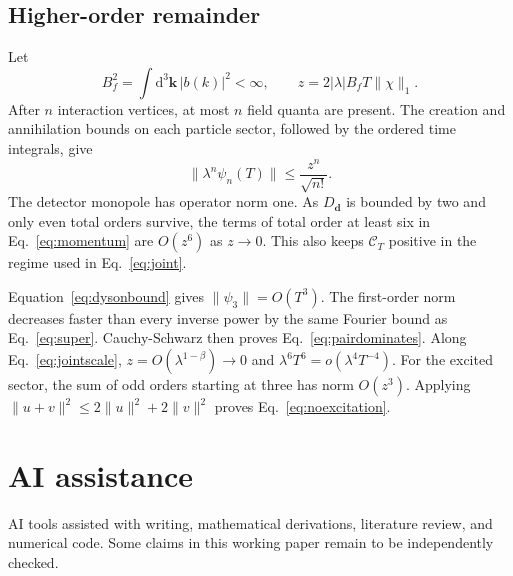 \documentclass[11pt,a4paper]{article}
\newcommand{\dd}{\mathrm{d}}
\newcommand{\cC}{\mathcal{C}}
\begin{document}
\subsection{Higher-order remainder}

Let
\begin{equation}
 B_f^2=\int\dd^3\bm k\,|b(k)|^2<\infty,
 \qquad z=2|\lambda|B_fT\|\chi\|_1.
\end{equation}
After $n$ interaction vertices, at most $n$ field quanta are present. The creation and annihilation bounds on each particle sector, followed by the ordered time integrals, give
\begin{equation}
 \|\lambda^n\psi_n(T)\|\leq\frac{z^n}{\sqrt{n!}}.\label{eq:dysonbound}
\end{equation}
The detector monopole has operator norm one. As $D_{\bm d}$ is bounded by two and only even total orders survive, the terms of total order at least six in Eq.~\eqref{eq:momentum} are $O(z^6)$ as $z\to0$. This also keeps $\cC_T$ positive in the regime used in Eq.~\eqref{eq:joint}.

Equation~\eqref{eq:dysonbound} gives $\|\psi_3\|=O(T^3)$. The first-order norm decreases faster than every inverse power by the same Fourier bound as Eq.~\eqref{eq:super}. Cauchy-Schwarz then proves Eq.~\eqref{eq:pairdominates}. Along Eq.~\eqref{eq:jointscale}, $z=O(\lambda^{1-\beta})\to0$ and $\lambda^6T^6=o(\lambda^4T^{-4})$. For the excited sector, the sum of odd orders starting at three has norm $O(z^3)$. Applying $\|u+v\|^2\leq2\|u\|^2+2\|v\|^2$ proves Eq.~\eqref{eq:noexcitation}.

\section*{AI assistance}
AI tools assisted with writing, mathematical derivations, literature review, and numerical code. Some claims in this working paper remain to be independently checked.



\end{document}

